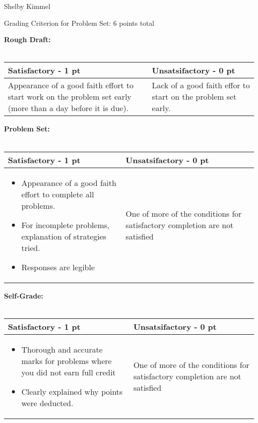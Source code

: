 \documentclass[12pt,landscape]{article}
\begin{document}
\hfill Shelby Kimmel

\begin{center}
{\huge Grading Criterion for Problem Set: 6 points total}
\end{center}
\bigskip

{\large \textbf{Rough Draft:}}\\~\\
{\renewcommand{\arraystretch}{2}
\begin{tabular}{|p{13cm}|p{7cm}|}
\hline
{\bf Satisfactory - 1 pt}& {\bf Unsatsifactory - 0 pt}\\
\hline

Appearance of a good faith effort to start work on the problem set early (more than a day before it is due).

  & Lack of a good faith effor to start on the problem set early.\\
  \hline
\end{tabular}}
\bigskip
\bigskip

{\large \textbf{Problem Set:}}\\~\\
{\renewcommand{\arraystretch}{2}
\begin{tabular}{|p{13cm}|p{7cm}|}
\hline
{\bf Satisfactory - 1 pt}& {\bf Unsatsifactory - 0 pt}\\
\hline
\begin{itemize}
\item Appearance of a good faith effort to complete all problems.
\item For incomplete problems, explanation of strategies tried.
\item Responses are legible
\end{itemize}
  & One of more of the conditions for satisfactory completion are not satisfied\\
  \hline
\end{tabular}}

\newpage
{\large \textbf{ Self-Grade:}}\\~\\
{\renewcommand{\arraystretch}{2}
\begin{tabular}{|p{13cm}|p{7cm}|}
\hline
{\bf Satisfactory - 1 pt}& {\bf Unsatsifactory - 0 pt}\\
\hline
\begin{itemize}
\item Thorough and accurate marks for problems where you did not earn full credit
\item Clearly explained why points were deducted.
\end{itemize}
  & One of more of the conditions for satisfactory completion are not satisfied\\
  \hline
\end{tabular}}
\end{document}
